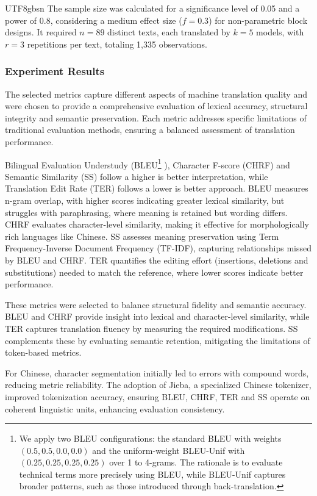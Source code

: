 \documentclass[conference]{IEEEtran}
\begin{document}
\begin{CJK*}{UTF8}{gbsn}
The sample size was calculated for a significance level of 0.05 and a power of 0.8, considering a medium effect size (\( f = 0.3 \)) for non-parametric block designs. It required \( n = 89 \) distinct texts, each translated by \( k = 5 \) models, with \( r = 3 \) repetitions per text, totaling 1,335 observations.

\subsubsection{Experiment Results}

The selected metrics capture different aspects of machine translation quality and were chosen to provide a comprehensive evaluation of lexical accuracy, structural integrity and semantic preservation. Each metric addresses specific limitations of traditional evaluation methods, ensuring a balanced assessment of translation performance.

Bilingual Evaluation Understudy (BLEU\footnote{We apply two BLEU configurations: the standard BLEU with weights $(0.5, 0.5, 0.0, 0.0)$ and the uniform-weight BLEU-Unif with $(0.25, 0.25, 0.25, 0.25)$ over 1 to 4-grams. The rationale is to evaluate technical terms more precisely using BLEU, while BLEU-Unif captures broader patterns, such as those introduced through back-translation.}
), Character F-score (CHRF) and Semantic Similarity (SS) follow a higher is better interpretation, while Translation Edit Rate (TER) follows a lower is better approach. BLEU measures n-gram overlap, with higher scores indicating greater lexical similarity, but struggles with paraphrasing, where meaning is retained but wording differs. CHRF evaluates character-level similarity, making it effective for morphologically rich languages like Chinese. SS assesses meaning preservation using Term Frequency-Inverse Document Frequency (TF-IDF), capturing relationships missed by BLEU and CHRF. TER quantifies the editing effort (insertions, deletions and substitutions) needed to match the reference, where lower scores indicate better performance.

These metrics were selected to balance structural fidelity and semantic accuracy. BLEU and CHRF provide insight into lexical and character-level similarity, while TER captures translation fluency by measuring the required modifications. SS complements these by evaluating semantic retention, mitigating the limitations of token-based metrics.

For Chinese, character segmentation initially led to errors with compound words, reducing metric reliability. The adoption of Jieba, a specialized Chinese tokenizer, improved tokenization accuracy, ensuring BLEU, CHRF, TER and SS operate on coherent linguistic units, enhancing evaluation consistency.


\end{CJK*}
\end{document}
